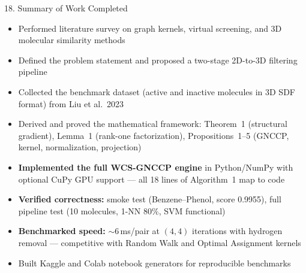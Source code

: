 \documentclass[aspectratio=169, 11pt]{beamer}
\begin{document}
\begin{frame}{18. Summary of Work Completed}
\small
\begin{itemize}

\item Performed literature survey on graph kernels, virtual screening, and 3D molecular similarity methods

\item Defined the problem statement and proposed a two-stage 2D-to-3D filtering pipeline

\item Collected the benchmark dataset (active and inactive molecules in 3D SDF format) from Liu et al.\ 2023

\item Derived and proved the mathematical framework: Theorem~1 (structural gradient), Lemma~1 (rank-one factorization), Propositions~1--5 (GNCCP, kernel, normalization, projection)

\item \textbf{Implemented the full WCS-GNCCP engine} in Python/NumPy with optional CuPy GPU support --- all 18 lines of Algorithm~1 map to code

\item \textbf{Verified correctness:} smoke test (Benzene--Phenol, score 0.9955), full pipeline test (10 molecules, 1-NN 80\%, SVM functional)

\item \textbf{Benchmarked speed:} ${\sim}6$\,ms/pair at $(4,4)$ iterations with hydrogen removal --- competitive with Random Walk and Optimal Assignment kernels

\item Built Kaggle and Colab notebook generators for reproducible benchmarks

\end{itemize}
\end{frame}
\end{document}
